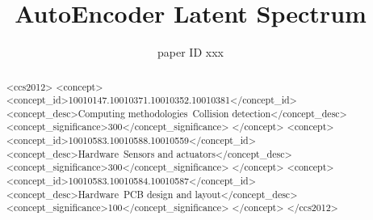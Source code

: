 \documentclass{egpubl}
\title[AutoEncoder Latent Spectrum]%
      {AutoEncoder Latent Spectrum}
\author[paper ID xxx]{{paper ID xxx}
        \\
}
\begin{document}
 
    

    

\maketitle
\begin{abstract}
\begin{CCSXML}
<ccs2012>
<concept>
<concept_id>10010147.10010371.10010352.10010381</concept_id>
<concept_desc>Computing methodologies~Collision detection</concept_desc>
<concept_significance>300</concept_significance>
</concept>
<concept>
<concept_id>10010583.10010588.10010559</concept_id>
<concept_desc>Hardware~Sensors and actuators</concept_desc>
<concept_significance>300</concept_significance>
</concept>
<concept>
<concept_id>10010583.10010584.10010587</concept_id>
<concept_desc>Hardware~PCB design and layout</concept_desc>
<concept_significance>100</concept_significance>
</concept>
</ccs2012>
\end{CCSXML}


\printccsdesc   
\end{abstract}  
\end{document}
